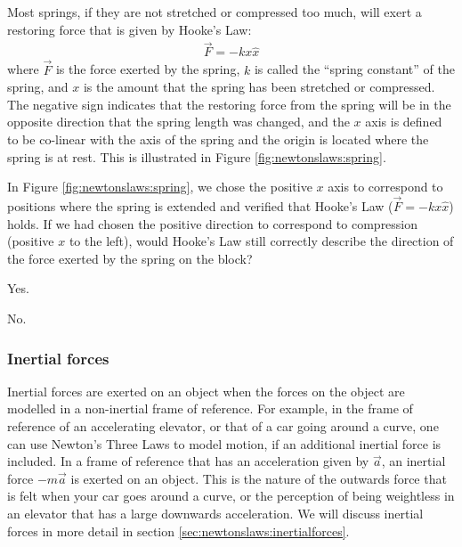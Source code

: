 Most springs, if they are not stretched or compressed too much, will exert a restoring force that is given by Hooke's Law:
\begin{align*}
\vec F = -kx \hat x
\end{align*}
where $\vec F$ is the force exerted by the spring, $k$ is called the ``spring constant'' of the spring, and $x$ is the amount that the spring has been stretched or compressed. The negative sign indicates that the restoring force from the spring will be in the opposite direction that the spring length was changed, and the $x$ axis is defined to be co-linear with the axis of the spring and the origin is located where the spring is at rest. This is illustrated in Figure \ref{fig:newtonslaws:spring}.


\begin{checkpoint}
\begin{MCquestion}{In Figure \ref{fig:newtonslaws:spring}, we chose the positive $x$ axis to correspond to positions where the spring is extended and verified that Hooke's Law ($\vec F=-kx\hat x$) holds. If we had chosen the positive direction to correspond to compression (positive $x$ to the left), would Hooke's Law still correctly describe the direction of the force exerted by the spring on the block?}
\item Yes. \correct
\item No.
\end{MCquestion}
\end{checkpoint}

\subsubsection{Inertial forces}
Inertial forces are exerted on an object when the forces on the object are modelled in a non-inertial frame of reference. For example, in the frame of reference of an accelerating elevator, or that of a car going around a curve, one can use Newton's Three Laws to model motion, if an additional inertial force is included. In a frame of reference that has an acceleration given by $\vec a$, an inertial force $-m\vec a$ is exerted on an object. This is the nature of the outwards force that is felt when your car goes around a curve, or the perception of being weightless in an elevator that has a large downwards acceleration. We will discuss inertial forces in more detail in section \ref{sec:newtonslaws:inertialforces}.


